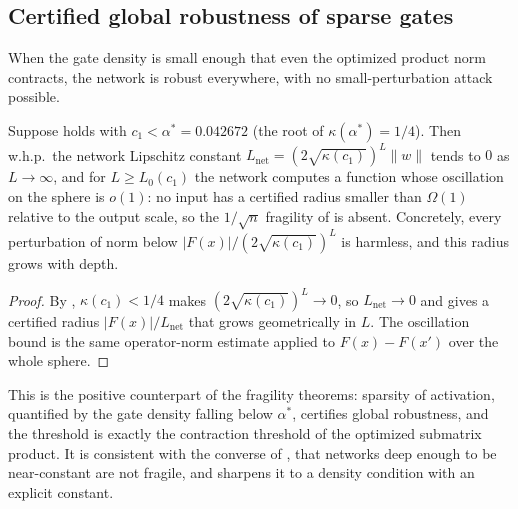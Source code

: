 \subsection{Certified global robustness of sparse gates}
When the gate density is small enough that even the optimized product norm contracts, the network is
robust everywhere, with no small-perturbation attack possible.

\begin{theorem}\label{thm:sparse-robust}
Suppose  holds with $c_1<\alpha^*=0.042672$ (the root of $\kappa(\alpha^*)=1/4$). Then
w.h.p.\ the network Lipschitz constant $L_{\mathrm{net}}=(2\sqrt{\kappa(c_1)})^L\|w\|$ tends to $0$ as
$L\to\infty$, and for $L\ge L_0(c_1)$ the network computes a function whose oscillation on the sphere is
$o(1)$: no input has a certified radius smaller than $\Omega(1)$ relative to the output scale, so the
$1/\sqrt n$ fragility of  is absent. Concretely, every perturbation of norm below
$|F(x)|/(2\sqrt{\kappa(c_1)})^L$ is harmless, and this radius grows with depth.
\end{theorem}

\begin{proof}
By , $\kappa(c_1)<1/4$ makes $(2\sqrt{\kappa(c_1)})^L\to0$, so
$L_{\mathrm{net}}\to0$ and  gives a certified radius $|F(x)|/L_{\mathrm{net}}$
that grows geometrically in $L$. The oscillation bound is the same operator-norm estimate applied to
$F(x)-F(x')$ over the whole sphere.
\end{proof}

This is the positive counterpart of the fragility theorems: sparsity of activation, quantified by the
gate density falling below $\alpha^*$, certifies global robustness, and the threshold is exactly the
contraction threshold of the optimized submatrix product. It is consistent with the converse of
\cite{bartlettBC21}, that networks deep enough to be near-constant are not fragile, and sharpens it to a
density condition with an explicit constant.
